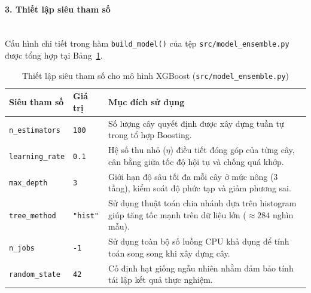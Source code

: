 \paragraph{3. Thiết lập siêu tham số}\mbox{}\\
Cấu hình chi tiết trong hàm \texttt{build\_model()} của tệp \texttt{src/model\_ensemble.py} được tổng hợp tại Bảng~\ref{tab:xgb_hyperparams}.

\begin{table}[H]
\centering
\caption{Thiết lập siêu tham số cho mô hình XGBoost (\texttt{src/model\_ensemble.py})}
\label{tab:xgb_hyperparams}
\renewcommand{\arraystretch}{1.2}
\begin{tabular}{|l|l|p{8.0cm}|}
\hline
\textbf{Siêu tham số} & \textbf{Giá trị} & \textbf{Mục đích sử dụng} \\
\hline
\texttt{n\_estimators} & \texttt{100} & Số lượng cây quyết định được xây dựng tuần tự trong tổ hợp Boosting. \\
\hline
\texttt{learning\_rate} & \texttt{0.1} & Hệ số thu nhỏ ($\eta$) điều tiết đóng góp của từng cây, cân bằng giữa tốc độ hội tụ và chống quá khớp. \\
\hline
\texttt{max\_depth} & \texttt{3} & Giới hạn độ sâu tối đa mỗi cây ở mức nông (3 tầng), kiểm soát độ phức tạp và giảm phương sai. \\
\hline
\texttt{tree\_method} & \texttt{"hist"} & Sử dụng thuật toán chia nhánh dựa trên histogram giúp tăng tốc mạnh trên dữ liệu lớn ($\approx 284$ nghìn mẫu). \\
\hline
\texttt{n\_jobs} & \texttt{-1} & Sử dụng toàn bộ số luồng CPU khả dụng để tính toán song song khi xây dựng cây. \\
\hline
\texttt{random\_state} & \texttt{42} & Cố định hạt giống ngẫu nhiên nhằm đảm bảo tính tái lập kết quả thực nghiệm. \\
\hline
\end{tabular}
\end{table}
